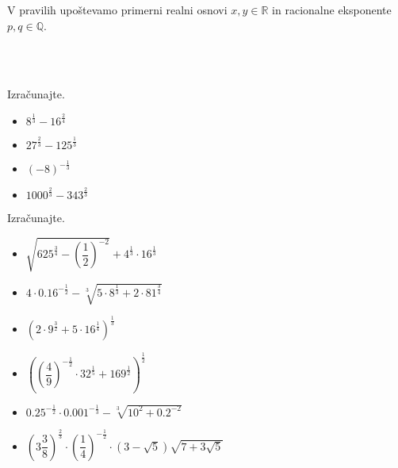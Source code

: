                 V pravilih upoštevamo primerni realni osnovi $x,y\in\mathbb{R}$ in racionalne eksponente $p,q\in\mathbb{Q}$.

                        ~\\~\\


            \begin{naloga}
                Izračunajte.
                \begin{itemize}
                    \item $\displaystyle 8^\frac{1}{3}-16^\frac{2}{4}$ 
                    \item $\displaystyle 27^\frac{2}{3}-125^\frac{1}{3}$ 
                    \item $\displaystyle \left(-8\right)^{-\frac{1}{3}}$ 
                    \item $\displaystyle 1000^\frac{2}{3}-343^\frac{2}{3}$ 
                \end{itemize}
            \end{naloga}

            
            \begin{naloga}
                Izračunajte.
                \begin{multicols}{2}
                    \begin{itemize}
                        \item $\displaystyle \sqrt{625^\frac{3}{4}-\left(\dfrac{1}{2}\right)^{-2}}+4^\frac{1}{3}\cdot 16^\frac{1}{3} $ 
                        \item $\displaystyle 4\cdot 0.16^{-\frac{1}{2}}-\sqrt[3]{5\cdot 8^\frac{1}{3}+2\cdot 81^\frac{3}{4}} $ 
                        \item $\displaystyle \left(2\cdot 9^\frac{3}{2}+5\cdot 16^\frac{1}{4}\right)^\frac{1}{3} $ 
                        \item $\displaystyle \left(\left(\dfrac{4}{9}\right)^{-\frac{1}{2}}\cdot 32^\frac{1}{5}+169^\frac{1}{2}\right)^\frac{1}{2} $ 
                        \item $\displaystyle 0.25^{-\frac{1}{2}}\cdot 0.001^{-\frac{1}{3}} -\sqrt[3]{10^2+0.2^{-2}} $ 
                        \item $\displaystyle \left(3\dfrac{3}{8}\right)^\frac{2}{3}\cdot\left(\dfrac{1}{4}\right)^{-\frac{1}{2}}\cdot\left(3-\sqrt{5}\right)\sqrt{7+3\sqrt{5}} $ 
                    \end{itemize}
                \end{multicols}
            \end{naloga}
        
